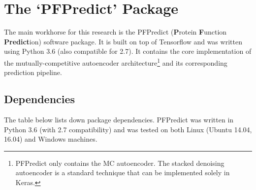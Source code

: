 %
%
%
%
%

\chapter{The `PFPredict' Package}
\label{AppendixPFPredict}

\par The main workhorse for this research is the PFPredict (\textbf{P}rotein
\textbf{F}unction \textbf{Predict}ion) software package. It is built on top of
Tensorflow and was written using Python 3.6 (also compatible for 2.7). It
contains the core implementation of the mutually-competitive autoencoder
architecture\footnote{
    PFPredict only contains the MC autoencoder. The stacked denoising
    autoencoder is a standard technique that can be implemented solely in
    Keras.
} and its corresponding prediction pipeline.

\section{Dependencies}

\par The table below lists down package dependencies. PFPredict was written in
Python 3.6 (with 2.7 compatibility) and was tested on both Linux (Ubuntu
14.04, 16.04) and Windows machines.

